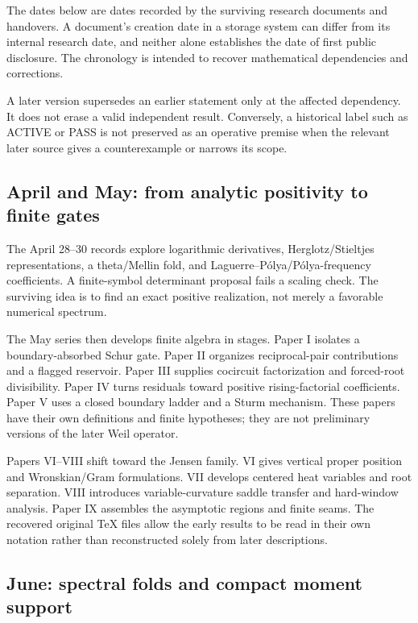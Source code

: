 \documentclass[
  10pt,
  a4paper,
  10pt,
  oneside,
  openany]{book}
\begin{document}
The dates below are dates recorded by the surviving research documents
and handovers. A document's creation date in a storage system can differ
from its internal research date, and neither alone establishes the date
of first public disclosure. The chronology is intended to recover
mathematical dependencies and corrections.

A later version supersedes an earlier statement only at the affected
dependency. It does not erase a valid independent result. Conversely, a
historical label such as ACTIVE or PASS is not preserved as an operative
premise when the relevant later source gives a counterexample or narrows
its scope.

\subsection{April and May: from analytic positivity to finite
gates}\label{april-and-may-from-analytic-positivity-to-finite-gates}

The April 28--30 records explore logarithmic derivatives,
Herglotz/Stieltjes representations, a theta/Mellin fold, and
Laguerre--Pólya/Pólya-frequency coefficients. A finite-symbol
determinant proposal fails a scaling check. The surviving idea is to
find an exact positive realization, not merely a favorable numerical
spectrum.

The May series then develops finite algebra in stages. Paper I isolates
a boundary-absorbed Schur gate. Paper II organizes reciprocal-pair
contributions and a flagged reservoir. Paper III supplies cocircuit
factorization and forced-root divisibility. Paper IV turns residuals
toward positive rising-factorial coefficients. Paper V uses a closed
boundary ladder and a Sturm mechanism. These papers have their own
definitions and finite hypotheses; they are not preliminary versions of
the later Weil operator.

Papers VI--VIII shift toward the Jensen family. VI gives vertical proper
position and Wronskian/Gram formulations. VII develops centered heat
variables and root separation. VIII introduces variable-curvature saddle
transfer and hard-window analysis. Paper IX assembles the asymptotic
regions and finite seams. The recovered original TeX files allow the
early results to be read in their own notation rather than reconstructed
solely from later descriptions.

\subsection{June: spectral folds and compact moment
support}\label{june-spectral-folds-and-compact-moment-support}
\end{document}
